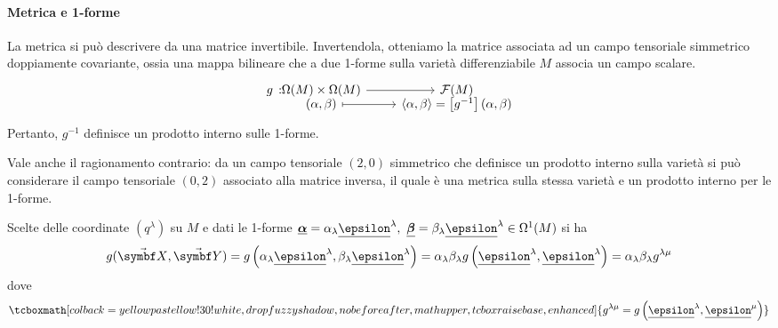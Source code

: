 \paragraph{Metrica e 1-forme}
La metrica  si può descrivere da una matrice invertibile. Invertendola, otteniamo la matrice associata ad un campo tensoriale simmetrico doppiamente covariante, ossia una mappa bilineare che a due 1-forme sulla varietà differenziabile $M$ associa un campo scalare.
\begin{equation}
	\funztot[g]{\Omega(M)\times \Omega(M)}{\mathcal{F}(M)}{\left(\alpha,\beta\right)}{\left<\alpha,\beta\right>=\left[g^{-1}\right](\alpha,\beta)}
\end{equation}
Pertanto, $g^{-1}$ definisce un prodotto interno sulle 1-forme. 
\begin{observe}%
	Vale anche il ragionamento contrario: da un campo tensoriale $(2,0)$ simmetrico che definisce un prodotto interno sulla varietà si può considerare il campo tensoriale $(0,2)$ associato alla matrice inversa, il quale è una metrica sulla stessa varietà e un prodotto interno per le 1-forme.
\end{observe}
Scelte delle coordinate $(q^\lambda)$ su $M$ e dati le 1-forme $\fb{\alpha}=\alpha_{\lambda}\fb{\epsilon}^\lambda,\ \fb{\beta}=\beta_{\lambda}\fb{\epsilon}^\lambda\in\Omega^1(M)$ si ha
\begin{equation*}
	g(\vba{X},\vba{Y})=g\left(\alpha_{\lambda}\fb{\epsilon}^\lambda,\beta_{\lambda}\fb{\epsilon}^\lambda\right)=\alpha_{\lambda} \beta_{\lambda} g\left(\fb{\epsilon}^\lambda,\fb{\epsilon}^\lambda\right)=\alpha_{\lambda} \beta_{\lambda} g^{\lambda \mu}
\end{equation*}
dove
\begin{equation}
	\tcboxmath[colback=yellowpastellow!30!white,drop fuzzy shadow, nobeforeafter, math upper, tcbox raise base, enhanced]{g^{\lambda \mu}=g\left(\fb{\epsilon}^\lambda,\fb{\epsilon}^\mu\right)}
\end{equation}
